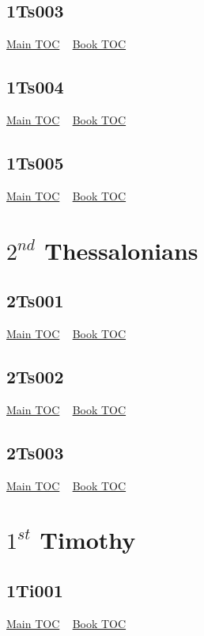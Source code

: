 \documentclass{book}
\begin{document}
  \section{1Ts003}\hyperlink{toc}{Main TOC} ~ \hyperref[subsec:1Ts]{Book TOC} 
  \section{1Ts004}\hyperlink{toc}{Main TOC} ~ \hyperref[subsec:1Ts]{Book TOC} 
  \section{1Ts005}\hyperlink{toc}{Main TOC} ~ \hyperref[subsec:1Ts]{Book TOC} 
  \chapter{$2^{nd}$ Thessalonians} \label{subsec:2Ts} \begin{multicols}{2} \minitoc \end{multicols}
  \section{2Ts001}\hyperlink{toc}{Main TOC} ~ \hyperref[subsec:2Ts]{Book TOC} 
  \section{2Ts002}\hyperlink{toc}{Main TOC} ~ \hyperref[subsec:2Ts]{Book TOC} 
  \section{2Ts003}\hyperlink{toc}{Main TOC} ~ \hyperref[subsec:2Ts]{Book TOC} 
  \chapter{$1^{st}$ Timothy} \label{subsec:1Ti} \begin{multicols}{2} \minitoc \end{multicols}
  \section{1Ti001}\hyperlink{toc}{Main TOC} ~ \hyperref[subsec:1Ti]{Book TOC} 
\end{document}
